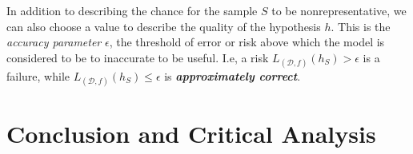 \documentclass[10pt,conference]{IEEEtran}
\def\dist{\mathcal{D}}
\begin{document}
    In addition to describing the chance for the sample $S$ to be nonrepresentative, we can also choose a value to describe the quality of the hypothesis $h$. This is the \emph{accuracy parameter} $\epsilon$, the threshold of error or risk above which the model is considered to be to inaccurate to be useful\cite{shais}. I.e, a risk $L_{(\dist, f)}(h_S) > \epsilon$ is a failure, while $L_{(\dist, f)}(h_S) \leq \epsilon$ is \textbf{\emph{approximately correct}}.


\section{Conclusion and Critical Analysis}
  
\nocite{*}




\vspace{12pt}
\end{document}
